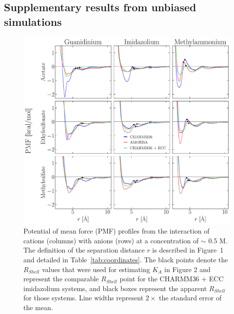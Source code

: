 \documentclass[journal=jacsat,articletitle=true,manuscript=suppinfo,layout=onecolumn]{achemso}
\begin{document}
    \subsection{Supplementary results from unbiased simulations}
    
    \begin{figure}[H]
    \begin{center}
        \includegraphics[width=\textwidth]{images/pmfs.pdf}
        \caption{Potential of mean force (PMF) profiles from the interaction of cations (columns) with anions (rows) at a concentration of $\sim$ 0.5 M. The definition of the separation distance $r$ is described in Figure~1 and detailed in Table~\ref{tab:coordinates}. The black points denote the $R_{Shell}$ values that were used for estimating $K_{A}$ in Figure 2
        and represent the comparable $R_{Shell}$ point for the CHARMM36 + ECC imidazolium systems, and black boxes represent the apparent $R_{Shell}$ for those systems. Line widths represent $2\times$ the standard error of the mean.}
        \label{sup-fig:pmfs}
    \end{center}
    \end{figure}
\end{document}
